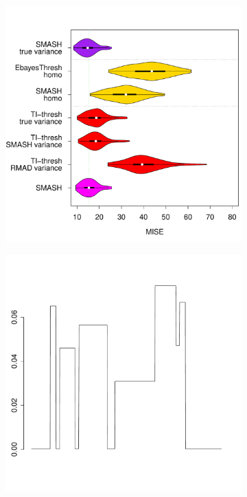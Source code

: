 \documentclass[12pt]{article}
\begin{document}
\begin{figure}
\centering
    \begin{subfigure}[b]{0.5\textwidth}
        \centering
        \includegraphics[width=\textwidth]{violin_gaus_hetero_1.pdf}
        \caption{}
        \label{fig:gaus_hetero_1}
    \end{subfigure}
		\hfill
    \begin{subfigure}[b]{0.45\textwidth}
        \centering
        \includegraphics[width=\textwidth]{violin_gaus_hetero_sd_1.pdf}

\end{subfigure}
\end{figure}
\end{document}
